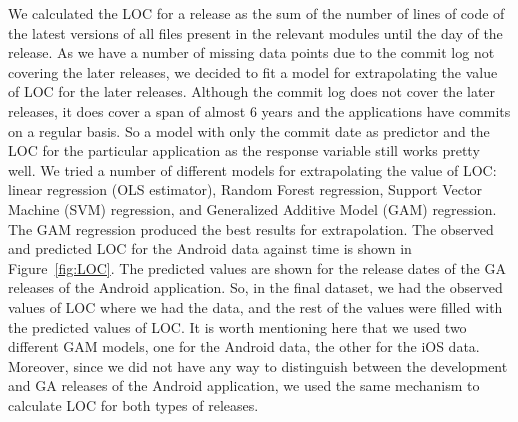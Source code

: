 \documentclass[smallcondensed]{svjour3}     %
\begin{document}
We calculated the LOC for a release as the sum of the number of lines of code of the latest versions of all files present in the relevant modules until the day of the release. As we have a number of missing data points due to the commit log not covering the later releases, we decided to fit a model for extrapolating the value of LOC for the later releases. Although the commit log does not cover the later releases, it does cover a span of almost 6 years and the applications have commits on a regular basis. So a model with only the commit date as predictor and the LOC for the particular application as the response variable still works pretty well. We tried a number of different models for extrapolating the value of LOC: linear regression (OLS estimator), Random Forest regression, Support Vector Machine (SVM) regression, and Generalized Additive Model (GAM) regression. The GAM regression produced the best results for extrapolation. The observed and predicted LOC for the Android data against time is shown in Figure~\ref{fig:LOC}. The predicted values are shown for the release dates of the GA releases of the Android application. So, in the final dataset, we had the observed values of LOC where we had the data, and the rest of the values were filled with the predicted values of LOC. It is worth mentioning here that we used two different GAM models, one for the Android data, the other for the iOS data. Moreover, since we did not have any way to distinguish between the development and GA releases of the Android application, we used the same mechanism to calculate LOC for both types of releases.
\end{document}

